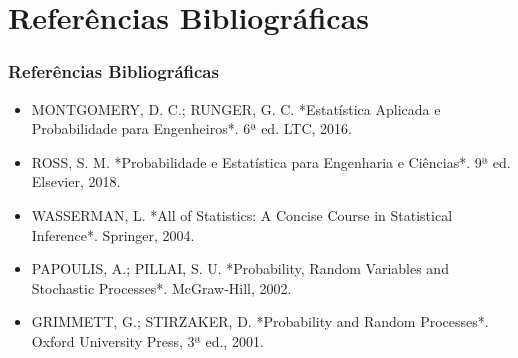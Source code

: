 \section{Referências Bibliográficas}

\begin{frame}[allowframebreaks]
    \frametitle{Referências Bibliográficas}

    \begin{itemize}
        \item MONTGOMERY, D. C.; RUNGER, G. C. *Estatística Aplicada e Probabilidade para Engenheiros*. 6ª ed. LTC, 2016.

        \item ROSS, S. M. *Probabilidade e Estatística para Engenharia e Ciências*. 9ª ed. Elsevier, 2018.

        \item WASSERMAN, L. *All of Statistics: A Concise Course in Statistical Inference*. Springer, 2004.

        \item PAPOULIS, A.; PILLAI, S. U. *Probability, Random Variables and Stochastic Processes*. McGraw-Hill, 2002.

        \item GRIMMETT, G.; STIRZAKER, D. *Probability and Random Processes*. Oxford University Press, 3ª ed., 2001.
    \end{itemize}

\end{frame}